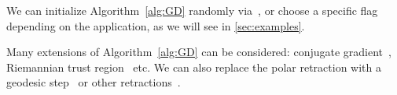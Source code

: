 \begin{remark}[Initialization]
We can initialize Algorithm~\ref{alg:GD} randomly via~\citet[Theorem~1.5.5]{chikuse_statistics_2003}, or choose a specific flag depending on the application, as we will see in \autoref{sec:examples}.
\end{remark}
\begin{remark}\label{rk:optim}
Many extensions of Algorithm~\ref{alg:GD} can be considered: conjugate gradient~\citep{ye_optimization_2022}, Riemannian trust region~\citep{absil_optimization_2009} etc. We can also replace the polar retraction with a geodesic step~\citep{ye_optimization_2022} or other retractions~\citep{zhu_practical_2024}.
\end{remark}
